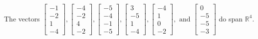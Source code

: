 \begin{exercise}
\begin{exerciseStatement}
  \end{exerciseStatement}
  \begin{exerciseAnswer}
   The vectors \(\left[\begin{array}{r}
-1 \\
-2 \\
1 \\
-4
\end{array}\right] , \left[\begin{array}{r}
-4 \\
-2 \\
4 \\
-2
\end{array}\right] , \left[\begin{array}{r}
-5 \\
-4 \\
-1 \\
-5
\end{array}\right] , \left[\begin{array}{r}
3 \\
-5 \\
1 \\
-4
\end{array}\right] , \left[\begin{array}{r}
-4 \\
1 \\
0 \\
-2
\end{array}\right] , \text{ and } \left[\begin{array}{r}
0 \\
-5 \\
-5 \\
-3
\end{array}\right]\) 
  	 do  
	span \(\mathbb{R}^4\).
  


  \end{exerciseAnswer}
\end{exercise}